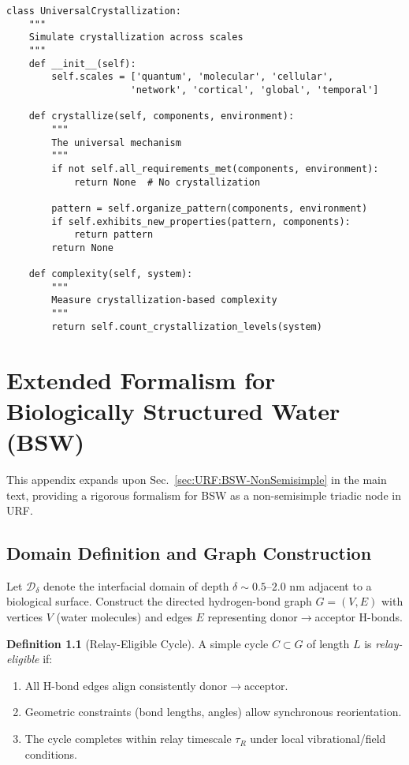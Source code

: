 \documentclass[12pt,oneside]{memoir}
\theoremstyle{plain}
\theoremstyle{definition}
\newtheorem{definition}[theorem]{Definition}
\theoremstyle{remark}
\begin{document}
\begin{lstlisting}
class UniversalCrystallization:
    """
    Simulate crystallization across scales
    """
    def __init__(self):
        self.scales = ['quantum', 'molecular', 'cellular', 
                      'network', 'cortical', 'global', 'temporal']
    
    def crystallize(self, components, environment):
        """
        The universal mechanism
        """
        if not self.all_requirements_met(components, environment):
            return None  # No crystallization
        
        pattern = self.organize_pattern(components, environment)
        if self.exhibits_new_properties(pattern, components):
            return pattern
        return None
    
    def complexity(self, system):
        """
        Measure crystallization-based complexity
        """
        return self.count_crystallization_levels(system)
\end{lstlisting}


\chapter{Extended Formalism for Biologically Structured Water (BSW)}
\label{app:BSW-formalism}

\noindent
This appendix expands upon Sec.~\ref{sec:URF:BSW-NonSemisimple} in the main text,
providing a rigorous formalism for BSW as a non-semisimple triadic node in URF.

\section{Domain Definition and Graph Construction}

Let $\mathcal{D}_\delta$ denote the interfacial domain of depth $\delta \sim 0.5$--$2.0$ nm adjacent to a biological surface. 
Construct the directed hydrogen-bond graph $G=(V,E)$ with vertices $V$ (water molecules) 
and edges $E$ representing donor$\to$acceptor H-bonds.

\begin{definition}[Relay-Eligible Cycle]
A simple cycle $C\subset G$ of length $L$ is \emph{relay-eligible} if:
\begin{enumerate}[label=\roman*.]
\item All H-bond edges align consistently donor$\to$acceptor.
\item Geometric constraints (bond lengths, angles) allow synchronous reorientation.
\item The cycle completes within relay timescale $\tau_R$ under local vibrational/field conditions.
\end{enumerate}
\end{definition}
\end{document}
